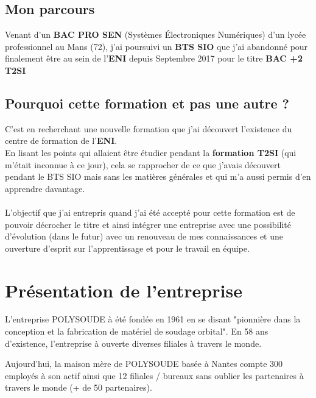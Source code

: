 \documentclass[11pt,a4paper,oneside]{article}
\begin{document}
\subsection{Mon parcours}
Venant d'un \textbf{BAC PRO SEN} (Systèmes Électroniques Numériques) d'un lycée professionnel au Mans (72), j'ai poursuivi un \textbf{BTS SIO} que j'ai abandonné pour finalement être au sein de l'\textbf{ENI} depuis Septembre 2017 pour le titre \textbf{BAC +2 T2SI}

\subsection{Pourquoi cette formation et pas une autre ?}

C'est en recherchant une nouvelle formation que j'ai découvert l'existence du centre de formation de l'\textbf{ENI}.\\

En lisant les points qui allaient être étudier pendant la \textbf{formation T2SI} (qui m'était inconnue à ce jour), cela se rapprocher de ce que j'avais découvert pendant le BTS SIO mais sans les matières générales et qui m'a aussi permis d'en apprendre davantage. \\
\\
L'objectif que j'ai entrepris quand j'ai été accepté pour cette formation est de pouvoir décrocher le titre et ainsi intégrer une entreprise avec une possibilité d'évolution (dans le futur) avec un renouveau de mes connaissances et une ouverture d'esprit sur l'apprentissage et pour le travail en équipe.
\newpage

\section{Présentation de l'entreprise}
L'entreprise POLYSOUDE à été fondée en 1961 en se disant "pionnière dans la conception et la fabrication de matériel de soudage orbital". En 58 ans d'existence, l'entreprise à ouverte diverses filiales à travers le monde.\

Aujourd'hui, la maison mère de POLYSOUDE basée à Nantes compte 300 employés à son actif ainsi que 12 filiales / bureaux sans oublier les partenaires à travers le monde (+ de 50 partenaires). \\
\end{document}
